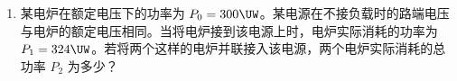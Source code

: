 \documentclass[\gkver]{gaokaozhenti}
\begin{document}
\begin{enumerate}
{$\alpha + \beta = 90^{\circ}$，$\sin\beta = \cos\alpha$

$\sin\beta = \sqrt{1 - \sin^{2}\alpha} = \frac{\sqrt{4n^{2} - 3}}{2n}$　　2 分

由折射定律

$n\sin\beta = \sin\gamma$

$\sin\gamma = n\cdot\frac{\sqrt{4n^{2} - 3}}{2n} = \frac{\sqrt{4n^{2} - 3}}{2}$　　2 分

$\delta = \sin^{-1}\frac{\sqrt{4n^{2} - 3}}{2} - 30^{\circ}$　　2 分

（2）要使有光线从 AC 面射出，应有

$\sin\gamma \le 1$

即 $\frac{\sqrt{4n^{2} - 3}}{2} \le 1$　　2 分

得 $n \le \frac{\sqrt{7}}{2}$　　2 分
}

\item
某电炉在额定电压下的功率为 $P_{0} = 300\UW$。某电源在不接负载时的路端电压与电炉的额定电压相同。当将电炉接到该电源上时，电炉实际消耗的功率为 $P_{1} = 324\UW$。若将两个这样的电炉并联接入该电源，两个电炉实际消耗的总功率 $P_{2}$ 为多少？


\end{enumerate}
\end{document}
